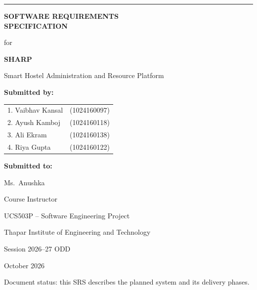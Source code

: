 \documentclass[11pt,a4paper]{article}
\numberwithin{figure}{section}   %
\begin{document}
\begin{titlepage}
\thispagestyle{empty}
\vspace*{0.25in}
\noindent\rule{\textwidth}{1.4pt}
\vspace{0.55in}
\begin{center}
{\Large\bfseries SOFTWARE REQUIREMENTS\\[0.15em] SPECIFICATION}\par
\vspace{0.5in}
{\large for}\par
\vspace{0.4in}
{\LARGE\bfseries SHARP}\par
\vspace{0.15in}
{\large Smart Hostel Administration and Resource Platform}\par
\vspace{0.35in}
{\normalsize\textbf{Submitted by:}}\par
\vspace{0.12in}
\begin{tabular}{ll}
1. Vaibhav Kansal & (1024160097)\\
2. Ayush Kamboj & (1024160118)\\
3. Ali Ekram & (1024160138)\\
4. Riya Gupta & (1024160122)
\end{tabular}\par
\vspace{0.35in}
{\normalsize\textbf{Submitted to:}}\par
\vspace{0.08in}
Ms.~Anushka\par
Course Instructor\par
UCS503P -- Software Engineering Project\par
\vspace{0.25in}
Thapar Institute of Engineering and Technology\par
Session 2026--27 ODD\par
\vspace{0.25in}
October 2026
\end{center}
\vfill
\begin{center}{\small Document status: this SRS describes the planned system and its delivery phases.}\end{center}
\end{titlepage}

\tableofcontents
\newpage

\end{document}
